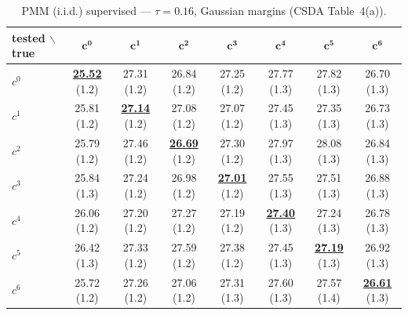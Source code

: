\begin{table}[htbp]
  \centering
  \small
  \setlength{\tabcolsep}{4pt}
  \caption{PMM (i.i.d.) supervised — $\tau = 0.16$, Gaussian margins (CSDA Table~4(a)).}
  \label{tab:exp2-low_tau_gauss}
  \begin{tabular}{lccccccc}
    \toprule
    tested $\backslash$ true & $\mathbf{c^{0}}$ & $\mathbf{c^{1}}$ & $\mathbf{c^{2}}$ & $\mathbf{c^{3}}$ & $\mathbf{c^{4}}$ & $\mathbf{c^{5}}$ & $\mathbf{c^{6}}$ \\
    \midrule
    $c^{0}$ & \textbf{\underline{25.52}} (1.2) & 27.31 (1.2) & 26.84 (1.2) & 27.25 (1.2) & 27.77 (1.3) & 27.82 (1.3) & 26.70 (1.3) \\
    $c^{1}$ & 25.81 (1.2) & \textbf{\underline{27.14}} (1.2) & 27.08 (1.2) & 27.07 (1.2) & 27.45 (1.3) & 27.35 (1.3) & 26.73 (1.3) \\
    $c^{2}$ & 25.79 (1.2) & 27.46 (1.2) & \textbf{\underline{26.69}} (1.2) & 27.30 (1.2) & 27.97 (1.3) & 28.08 (1.3) & 26.84 (1.3) \\
    $c^{3}$ & 25.84 (1.3) & 27.24 (1.2) & 26.98 (1.2) & \textbf{\underline{27.01}} (1.2) & 27.55 (1.3) & 27.51 (1.3) & 26.88 (1.3) \\
    $c^{4}$ & 26.06 (1.2) & 27.20 (1.2) & 27.27 (1.2) & 27.19 (1.2) & \textbf{\underline{27.40}} (1.3) & 27.24 (1.3) & 26.78 (1.3) \\
    $c^{5}$ & 26.42 (1.3) & 27.33 (1.2) & 27.59 (1.2) & 27.38 (1.2) & 27.45 (1.3) & \textbf{\underline{27.19}} (1.3) & 26.92 (1.3) \\
    $c^{6}$ & 25.72 (1.2) & 27.26 (1.2) & 27.06 (1.2) & 27.31 (1.3) & 27.60 (1.3) & 27.57 (1.4) & \textbf{\underline{26.61}} (1.3) \\
    \bottomrule
  \end{tabular}
\end{table}
